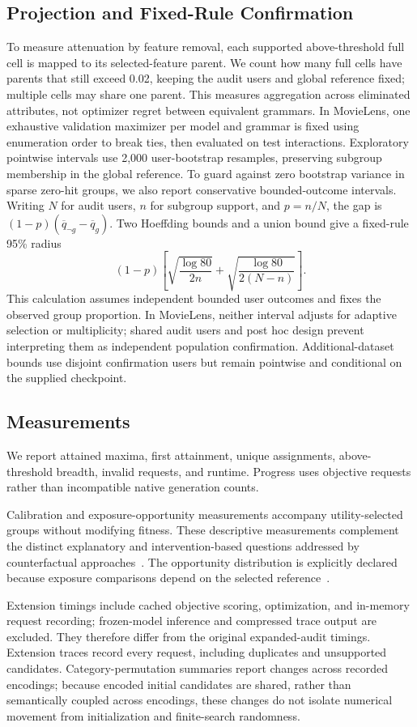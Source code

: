 \subsection{Projection and Fixed-Rule Confirmation}
To measure attenuation by feature removal, each supported above-threshold full cell is mapped to its selected-feature parent. We count how many full cells have parents that still exceed 0.02, keeping the audit users and global reference fixed; multiple cells may share one parent. This measures aggregation across eliminated attributes, not optimizer regret between equivalent grammars. In MovieLens, one exhaustive validation maximizer per model and grammar is fixed using enumeration order to break ties, then evaluated on test interactions. Exploratory pointwise intervals use 2,000 user-bootstrap resamples, preserving subgroup membership in the global reference. To guard against zero bootstrap variance in sparse zero-hit groups, we also report conservative bounded-outcome intervals. Writing $N$ for audit users, $n$ for subgroup support, and $p=n/N$, the gap is $(1-p)(\overline q_{\neg g}-\overline q_g)$. Two Hoeffding bounds and a union bound give a fixed-rule 95\% radius
\begin{equation}
(1-p)\left[\sqrt{\frac{\log 80}{2n}}+\sqrt{\frac{\log 80}{2(N-n)}}\right].
\end{equation}
This calculation assumes independent bounded user outcomes and fixes the observed group proportion. In MovieLens, neither interval adjusts for adaptive selection or multiplicity; shared audit users and post hoc design prevent interpreting them as independent population confirmation. Additional-dataset bounds use disjoint confirmation users but remain pointwise and conditional on the supplied checkpoint.

\subsection{Measurements}
We report attained maxima, first attainment, unique assignments, above-threshold breadth, invalid requests, and runtime. Progress uses objective requests rather than incompatible native generation counts.

Calibration and exposure-opportunity measurements accompany utility-selected groups without modifying fitness. These descriptive measurements complement the distinct explanatory and intervention-based questions addressed by counterfactual approaches~\cite{li2021towards,medda2024gnnuers}. The opportunity distribution is explicitly declared because exposure comparisons depend on the selected reference~\cite{singh2018fairness}.

Extension timings include cached objective scoring, optimization, and in-memory request recording; frozen-model inference and compressed trace output are excluded. They therefore differ from the original expanded-audit timings. Extension traces record every request, including duplicates and unsupported candidates. Category-permutation summaries report changes across recorded encodings; because encoded initial candidates are shared, rather than semantically coupled across encodings, these changes do not isolate numerical movement from initialization and finite-search randomness.
